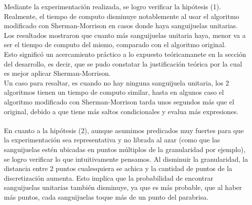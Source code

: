 Mediante la experimentación realizada, se logro verificar la hipótesis (1). Realmente, el tiempo de computo disminuye notablemente al usar el algoritmo modificado con Sherman-Morrison en casos donde haya sanguijuelas unitarias. Los resultados mostraron que cuanto más sanguijuelas unitaria haya, menor va a ser el tiempo de computo del mismo, comparado con el algoritmo original.\\
Esto significó un acercamiento práctico a lo expuesto teóricamanete en la sección del desarrollo, es decir, que se pudo constatar la justificación teórica por la cual es mejor aplicar Sherman-Morrison.\\
Un caso para resaltar, es cuando no hay ninguna sanguijuela unitaria, los 2 algoritmos tienen un tiempo de computo similar, hasta en algunos caso el algoritmo modificado con Sherman-Morrison tarda unos segundos más que el original, debido a que tiene más saltos condicionales y evalua más expresiones.\\
\\
En cuanto a la hipótesis (2), aunque asumimos predicados muy fuertes para que la experimentación sea representativa y no librada al azar (como que las sanguijuelas estén ubicadas en puntos múltiplos de la granularidad por ejemplo), se logro verificar lo que intuitivamente pensamos. Al disminuir la granularidad, la distancia entre 2 puntos cualesquiera se achica y la cantidad de puntos de la discretización aumenta. Esto implica que la probabilidad de encontrar sanguijuelas unitarias también disminuye, ya que es más probable, que al haber más puntos, cada sanguijuelas toque más de un punto del parabrisa.



